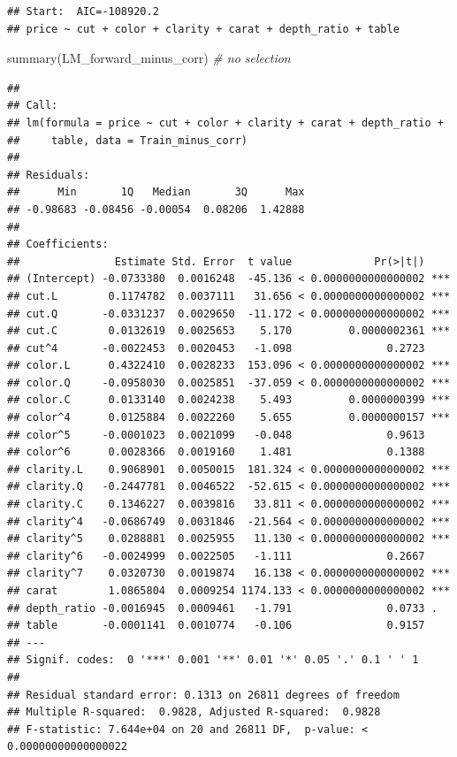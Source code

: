 \documentclass[
]{article}
\newenvironment{Shaded}{\begin{snugshade}}{\end{snugshade}}
\newcommand{\CommentTok}[1]{\textcolor[rgb]{0.56,0.35,0.01}{\textit{#1}}}
\newcommand{\FunctionTok}[1]{\textcolor[rgb]{0.00,0.00,0.00}{#1}}
\newcommand{\NormalTok}[1]{#1}
\begin{document}
\begin{verbatim}
## Start:  AIC=-108920.2
## price ~ cut + color + clarity + carat + depth_ratio + table
\end{verbatim}

\begin{Shaded}
\begin{Highlighting}[]
\FunctionTok{summary}\NormalTok{(LM\_forward\_minus\_corr)    }\CommentTok{\# no selection}
\end{Highlighting}
\end{Shaded}

\begin{verbatim}
## 
## Call:
## lm(formula = price ~ cut + color + clarity + carat + depth_ratio + 
##     table, data = Train_minus_corr)
## 
## Residuals:
##      Min       1Q   Median       3Q      Max 
## -0.98683 -0.08456 -0.00054  0.08206  1.42888 
## 
## Coefficients:
##               Estimate Std. Error  t value             Pr(>|t|)    
## (Intercept) -0.0733380  0.0016248  -45.136 < 0.0000000000000002 ***
## cut.L        0.1174782  0.0037111   31.656 < 0.0000000000000002 ***
## cut.Q       -0.0331237  0.0029650  -11.172 < 0.0000000000000002 ***
## cut.C        0.0132619  0.0025653    5.170         0.0000002361 ***
## cut^4       -0.0022453  0.0020453   -1.098               0.2723    
## color.L      0.4322410  0.0028233  153.096 < 0.0000000000000002 ***
## color.Q     -0.0958030  0.0025851  -37.059 < 0.0000000000000002 ***
## color.C      0.0133140  0.0024238    5.493         0.0000000399 ***
## color^4      0.0125884  0.0022260    5.655         0.0000000157 ***
## color^5     -0.0001023  0.0021099   -0.048               0.9613    
## color^6      0.0028366  0.0019160    1.481               0.1388    
## clarity.L    0.9068901  0.0050015  181.324 < 0.0000000000000002 ***
## clarity.Q   -0.2447781  0.0046522  -52.615 < 0.0000000000000002 ***
## clarity.C    0.1346227  0.0039816   33.811 < 0.0000000000000002 ***
## clarity^4   -0.0686749  0.0031846  -21.564 < 0.0000000000000002 ***
## clarity^5    0.0288881  0.0025955   11.130 < 0.0000000000000002 ***
## clarity^6   -0.0024999  0.0022505   -1.111               0.2667    
## clarity^7    0.0320730  0.0019874   16.138 < 0.0000000000000002 ***
## carat        1.0865804  0.0009254 1174.133 < 0.0000000000000002 ***
## depth_ratio -0.0016945  0.0009461   -1.791               0.0733 .  
## table       -0.0001141  0.0010774   -0.106               0.9157    
## ---
## Signif. codes:  0 '***' 0.001 '**' 0.01 '*' 0.05 '.' 0.1 ' ' 1
## 
## Residual standard error: 0.1313 on 26811 degrees of freedom
## Multiple R-squared:  0.9828, Adjusted R-squared:  0.9828 
## F-statistic: 7.644e+04 on 20 and 26811 DF,  p-value: < 0.00000000000000022
\end{verbatim}
\end{document}

